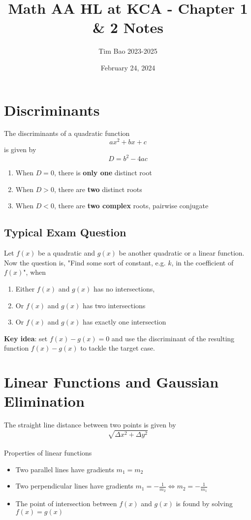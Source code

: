 \documentclass[11pt]{article}
\title{Math AA HL at KCA - Chapter 1 \& 2 Notes}
\author{Tim Bao 2023-2025}
\date{February 24, 2024}
\newcommand{\lb}{\\[8pt]}
\begin{document}
\maketitle
\pagebreak

\section{Discriminants}

The discriminants of a quadratic function $$ax^2 + bx + c$$ is given by $$D = b^2 - 4ac$$
\begin{enumerate}
  \item When $D = 0$, there is \textbf{only one} distinct root
  \item When $D > 0$, there are \textbf{two} distinct roots
  \item When $D < 0$, there are \textbf{two complex} roots, pairwise conjugate
\end{enumerate}

\subsection*{Typical Exam Question}

Let $f(x)$ be a quadratic and $g(x)$ be another quadratic or a linear function. Now the question is, "Find some sort of constant, e.g. $k$, in the coefficient of $f(x)$", when

\begin{enumerate}
  \item Either $f(x)$ and $g(x)$ has no intersections,
  \item Or $f(x)$ and $g(x)$ has two intersections
  \item Or $f(x)$ and $g(x)$ has exactly one intersection
\end{enumerate}
\textbf{Key idea}: set $f(x) - g(x) = 0$ and use the discriminant of the resulting function $f(x) - g(x)$ to tackle the target case.

\pagebreak

\section{Linear Functions and Gaussian Elimination}

The straight line distance between two points is given by $$\sqrt{\Delta x^2 + \Delta y^2}$$\lb
Properties of linear functions
\begin{itemize}
  \item Two parallel lines have gradients $m_1 = m_2$
  \item Two perpendicular lines have gradients $m_1 = -\frac{1}{m_2} \iff m_2 = -\frac{1}{m_1}$
  \item The point of intersection between $f(x)$ and $g(x)$ is found by solving $f(x) = g(x)$
\end{itemize}
\end{document}
